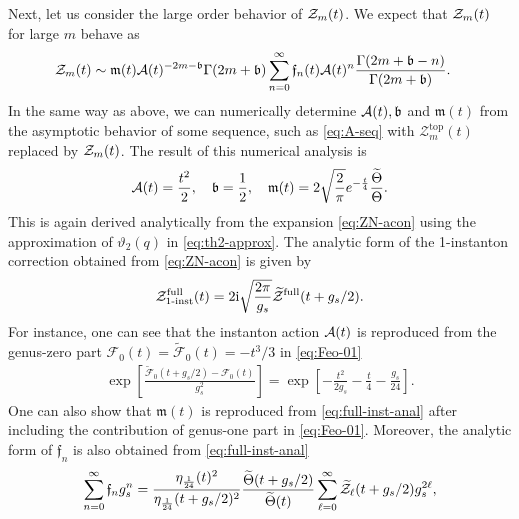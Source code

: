 \documentclass[11pt]{article}
\newcommand{\ri}{{\rm i}}
\newcommand{\hf}{\frac{1}{2}}
\def\til#1{\widetilde{#1}}
\def\Ga{\Gamma}
\def\rt#1{\sqrt{#1}}
\newcommand{\Ztop}{\mathcal{Z}^{\text{top}}}
\renewcommand{\[}{\begin{eqnarray}}
\renewcommand{\]}{\end{eqnarray}}
\newcommand{\Zefull}{{\cal Z}^{\text{full}}}
\newcommand{\Zofull}{{\widetilde{\cal Z}}^{\text{full}}}
\newcommand{\Zeven}{{\cal Z}}
\newcommand{\Zodd}{{\widetilde{\cal Z}}}
\newcommand{\Thetaeven}{\Theta}
\newcommand{\Thetaodd}{{\widetilde{\Theta}}}
\newcommand{\Aeven}{{\cal A}}
\newcommand{\beven}{\mathfrak{b}}
\newcommand{\feven}{\mathfrak{f}}
\newcommand{\mueven}{\mathfrak{m}}
\begin{document}
Next, let us consider the large order behavior of $\Zeven_m(t)$.
We expect that $\Zeven_m(t)$ for large $m$ behave as
%
\begin{align}
\begin{aligned}
 \Zeven_m(t)
&\sim\mueven(t) \Aeven(t)^{-2m-\beven}\Ga(2m+\beven)\sum_{n=0}^\infty
  \feven_n(t) \Aeven(t)^n\frac{\Ga(2m+\beven-n)}{\Ga(2m+\beven)}.
\end{aligned}
\label{eq:Zeven-asymp}
\end{align}
%
In the same way as above, we can numerically determine
$\Aeven(t),\beven$ and $\mueven(t)$
from the asymptotic behavior of some sequence, such
as \eqref{eq:A-seq}
with $\Ztop_m(t)$ replaced by $\Zeven_m(t)$. 
The result of this numerical analysis is
\begin{align}
 \Aeven(t)=\frac{t^2}{2},\quad \beven=\hf,\quad
\mueven(t)=2\rt{\frac{2}{\pi}}e^{-\frac{t}{4}}\frac{\Thetaodd}{\Thetaeven}.
\end{align}
This is again derived analytically from 
the expansion \eqref{eq:ZN-acon}
using the approximation of $\vartheta_2(q)$ in \eqref{eq:th2-approx}.
The analytic form of the 1-instanton correction
obtained from \eqref{eq:ZN-acon}
is given by
\begin{equation}
\begin{aligned}
 \Zefull_{\text{1-inst}}(t)=2\ri\rt{\frac{2\pi}{g_s}}
\Zofull(t+g_s/2).
\end{aligned} 
\label{eq:full-inst-anal}
\end{equation} 
For instance, one can see that
the instanton action
$\Aeven(t)$ is reproduced from the genus-zero part 
$\mathcal{F}_0(t)=\til{\mathcal{F}}_0(t)=-t^3/3$
in \eqref{eq:Feo-01}
\begin{equation}
\begin{aligned}
 \exp\left[\frac{\til{\mathcal{F}}_0(t+g_s/2)
-\mathcal{F}_0(t)}{g_s^2}\right]=\exp\left[-\frac{t^2}{2g_s}
-\frac{t}{4}-\frac{g_s}{24}\right].
\end{aligned} 
\label{eq:calF0-shift}
\end{equation}
One can also show that $\mueven(t)$
is reproduced from
\eqref{eq:full-inst-anal} after including the contribution
of genus-one part in \eqref{eq:Feo-01}. 
Moreover, the analytic form of $\feven_n$ is also obtained from 
 \eqref{eq:full-inst-anal}
\begin{align}
 \sum_{n=0}^\infty \feven_n g_s^n
 =\frac{\eta_{\frac{1}{24}}(t)^2}{\eta_{\frac{1}{24}}(t+g_s/2)^2}
  \frac{\Thetaodd(t+g_s/2)}{\Thetaodd(t)}
\sum_{\ell=0}^\infty \Zodd_\ell(t+g_s/2)g_s^{2\ell},
\end{align}
\end{document}
